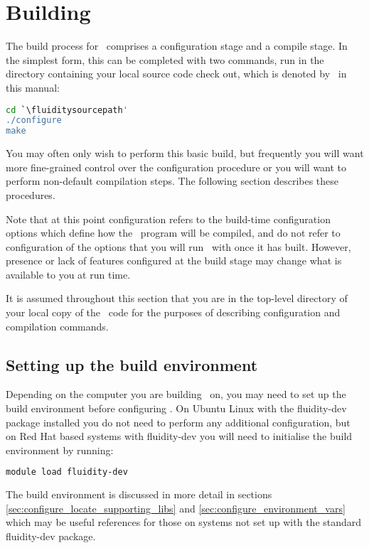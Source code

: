 \section{Building \fluidity}
\label{sec:building_fluidity}

The build process for \fluidity\ comprises a configuration stage and a compile
stage. In the simplest form, this can be completed with two commands, run in
the directory containing your local source code check out, which is denoted
by \fluiditysourcepath\ in this manual:

\begin{lstlisting}[language=Bash]
cd `\fluiditysourcepath'
./configure
make
\end{lstlisting}

You may often only wish to perform this basic build, but frequently you will
want more fine-grained control over the configuration procedure or you will
want to perform non-default compilation steps. The following section describes
these procedures.

Note that at this point configuration refers to the build-time configuration
options which define how the \fluidity\ program will be compiled, and do not
refer to configuration of the options that you will run \fluidity\ with once it
has built. However, presence or lack of features configured at the build stage
may change what is available to you at run time.

It is assumed throughout this section that you are in the top-level directory
of your local copy of the \fluidity\ code for the purposes of describing
configuration and compilation commands.

\subsection{Setting up the build environment}

Depending on the computer you are building \fluidity\ on, you may need to set
up the build environment before configuring \fluidity. On Ubuntu Linux with the
fluidity-dev package installed you do not need to perform any additional
configuration, but on Red Hat based systems with fluidity-dev you will need to
initialise the build environment by running:

\begin{lstlisting}[language=Bash]
module load fluidity-dev
\end{lstlisting}

The build environment is discussed in more detail in sections
\ref{sec:configure_locate_supporting_libs} and
\ref{sec:configure_environment_vars} which may be useful references for those
on systems not set up with the standard fluidity-dev package.

